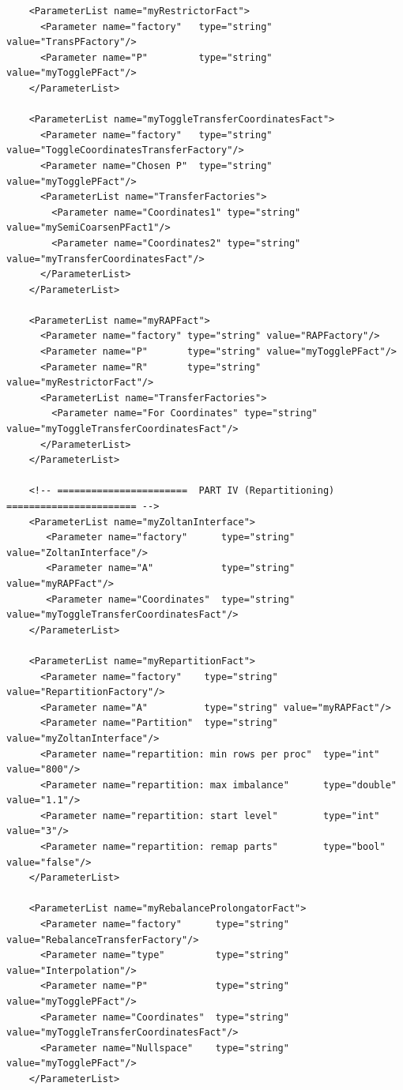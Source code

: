 \documentclass[10pt,fleqn]{book}
\begin{document}
\begin{lstlisting}
    <ParameterList name="myRestrictorFact">
      <Parameter name="factory"   type="string" value="TransPFactory"/>
      <Parameter name="P"         type="string" value="myTogglePFact"/>
    </ParameterList>

    <ParameterList name="myToggleTransferCoordinatesFact">
      <Parameter name="factory"   type="string" value="ToggleCoordinatesTransferFactory"/>
      <Parameter name="Chosen P"  type="string" value="myTogglePFact"/>
      <ParameterList name="TransferFactories">
        <Parameter name="Coordinates1" type="string" value="mySemiCoarsenPFact1"/>
        <Parameter name="Coordinates2" type="string" value="myTransferCoordinatesFact"/>
      </ParameterList>
    </ParameterList>

    <ParameterList name="myRAPFact">
      <Parameter name="factory" type="string" value="RAPFactory"/>
      <Parameter name="P"       type="string" value="myTogglePFact"/>
      <Parameter name="R"       type="string" value="myRestrictorFact"/>
      <ParameterList name="TransferFactories">
        <Parameter name="For Coordinates" type="string" value="myToggleTransferCoordinatesFact"/>
      </ParameterList>
    </ParameterList>

    <!-- =======================  PART IV (Repartitioning)  ======================= -->
    <ParameterList name="myZoltanInterface">
       <Parameter name="factory"      type="string" value="ZoltanInterface"/>
       <Parameter name="A"            type="string" value="myRAPFact"/>
       <Parameter name="Coordinates"  type="string" value="myToggleTransferCoordinatesFact"/>
    </ParameterList>

    <ParameterList name="myRepartitionFact">
      <Parameter name="factory"    type="string" value="RepartitionFactory"/>
      <Parameter name="A"          type="string" value="myRAPFact"/>
      <Parameter name="Partition"  type="string" value="myZoltanInterface"/>
      <Parameter name="repartition: min rows per proc"  type="int"    value="800"/>
      <Parameter name="repartition: max imbalance"      type="double" value="1.1"/>
      <Parameter name="repartition: start level"        type="int"    value="3"/>
      <Parameter name="repartition: remap parts"        type="bool"   value="false"/>
    </ParameterList>

    <ParameterList name="myRebalanceProlongatorFact">
      <Parameter name="factory"      type="string" value="RebalanceTransferFactory"/>
      <Parameter name="type"         type="string" value="Interpolation"/>
      <Parameter name="P"            type="string" value="myTogglePFact"/>
      <Parameter name="Coordinates"  type="string" value="myToggleTransferCoordinatesFact"/>
      <Parameter name="Nullspace"    type="string" value="myTogglePFact"/>
    </ParameterList>


\end{lstlisting}
\end{document}
